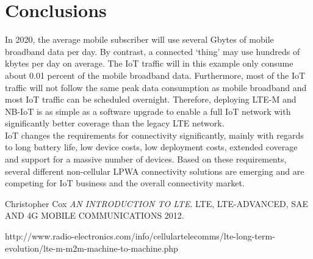 \documentclass[12pt]{article}
\begin{document}
\section{Conclusions}\label{conclusions}
In 2020, the average mobile subscriber will use several Gbytes of mobile broadband data per day. By contrast, a connected ‘thing’ may use hundreds of kbytes per day on average. The IoT traffic will in this example only consume about 0.01 percent of the mobile broadband data. Furthermore, most of the IoT traffic will not follow the same peak data consumption as mobile broadband and most IoT traffic can be scheduled overnight. Therefore, deploying LTE-M and NB-IoT is as simple as a software upgrade to enable a full IoT network with significantly better coverage than the legacy LTE network.\\
IoT changes the requirements for connectivity significantly, mainly with regards to long battery life, low
device costs, low deployment costs, extended coverage and support for a massive number of devices.
Based on these requirements, several different non-cellular LPWA connectivity solutions are emerging and
are competing for IoT business and the overall connectivity market. 

\begin{thebibliography}{9}
Christopher Cox
\textit{AN INTRODUCTION
TO LTE}.
LTE, LTE-ADVANCED, SAE
AND 4G MOBILE COMMUNICATIONS 2012.

\bibitem http://www.radio-electronics.com/info/cellulartelecomms/lte-long-term-evolution/lte-m-m2m-machine-to-machine.php
\end{thebibliography}
\end{document}
